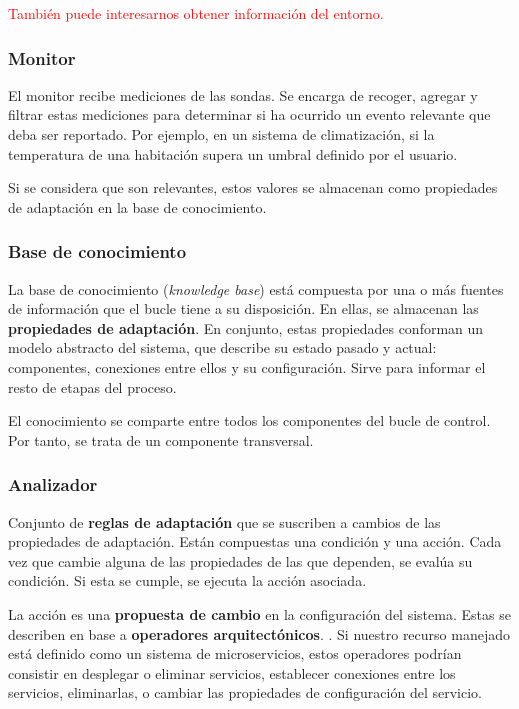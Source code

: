 \textcolor{red}{También puede interesarnos obtener información del entorno.}

\subsubsection{Monitor}
El monitor recibe mediciones de las sondas. Se encarga de recoger, agregar y filtrar estas mediciones para determinar si ha ocurrido un evento relevante que deba ser reportado. Por ejemplo, en un sistema de climatización, si la temperatura de una habitación supera un umbral definido por el usuario.

Si se considera que son relevantes, estos valores se almacenan como propiedades de adaptación en la base de conocimiento. \cite{fonsEspecificacionSistemasAutoadaptativos2021}

\subsubsection{Base de conocimiento}

La base de conocimiento (\emph{knowledge base}) está compuesta por una o más fuentes de información que el bucle tiene a su disposición. En ellas, se almacenan las \textbf{propiedades de adaptación}. En conjunto, estas propiedades conforman un modelo abstracto del sistema, que describe su estado pasado y actual: componentes, conexiones entre ellos y su configuración. \cite{garlanIncreasingSystemDependability2003} Sirve para informar el resto de etapas del proceso.


El conocimiento se comparte entre todos los componentes del bucle de control. Por tanto, se trata de un componente transversal.

\subsubsection{Analizador}

Conjunto de \textbf{reglas de adaptación} que se suscriben a cambios de las propiedades de adaptación. Están compuestas una condición y una acción. Cada vez que cambie alguna de las propiedades de las que dependen, se evalúa su condición. Si esta se cumple, se ejecuta la acción asociada.

La acción es una \textbf{propuesta de cambio} en la configuración del sistema. Estas se describen en base a \textbf{operadores arquitectónicos}. \cite{garlanIncreasingSystemDependability2003}. Si nuestro recurso manejado está definido como un sistema de microservicios, estos operadores podrían consistir en desplegar o eliminar servicios, establecer conexiones entre los servicios, eliminarlas, o cambiar las propiedades de configuración del servicio.

